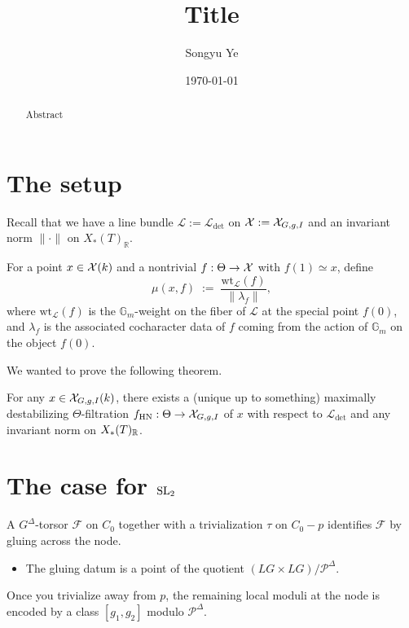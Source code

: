 \documentclass[12pt]{article}
\begin{document}
\rhead{\today}
\cfoot{\thepage}

\title{Title}
\author{Songyu Ye}
\date{\today}
\maketitle

\begin{abstract}
    Abstract
\end{abstract}

\tableofcontents

\section{The setup}
Recall that we have a line bundle $\mathcal L:=\mathcal L_{\det}$ on ${\mathcal{X}}:={\mathcal{X}}_{G,g,I}$ and an invariant norm $\|\cdot\|$ on $X_*(T)_\mathbb R$.

For a point $x\in {\mathcal{X}}(k)$ and a nontrivial $f:\Theta\to {\mathcal{X}}$ with $f(1)\simeq x$, define
$$\mu(x,f)\;:=\;\frac{\mathrm{wt}_{\mathcal L}(f)}{\|\lambda_f\|},$$
where $\mathrm{wt}_{\mathcal L}(f)$ is the $\mathbb G_m$-weight on the fiber of $\mathcal L$ at the special point $f(0)$, and $\lambda_f$ is the associated cocharacter data of $f$ coming from the action of $\mathbb G_m$ on the object $f(0)$.

We wanted to prove the following theorem.
\begin{theorem}
    For any $x\in {\mathcal{X}}_{G,g,I}(k)$, there exists a (unique up to something) maximally destabilizing $\Theta$-filtration $f_{\mathrm{HN}}:\Theta\to {\mathcal{X}}_{G,g,I}$ of $x$ with respect to $\mathcal L_{\det}$ and any invariant norm on $X_*(T)_{\mathbb{R}}$.
\end{theorem}

\section{The case for $\operatorname{SL}_2$}

A $G^\Delta$-torsor $\mathcal{F}$ on $C_0$ together with a trivialization $\tau$ on $C_0-p$ identifies $\mathcal{F}$ by gluing across the node.
\begin{itemize}
    \item The gluing datum is a point of the quotient $(LG\times LG)/\mathcal{P}^\Delta$.
\end{itemize}
Once you trivialize away from $p$, the remaining local moduli at the node is encoded by a class $[g_1,g_2]$ modulo $\mathcal{P}^\Delta$.
\end{document}
